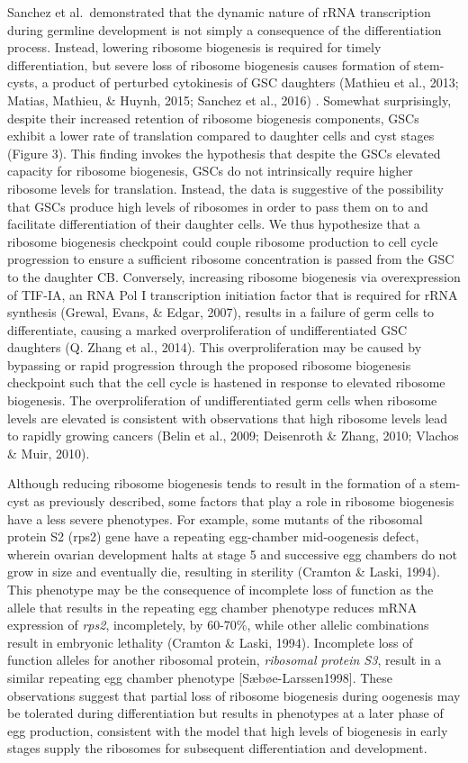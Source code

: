 \documentclass[12pt,oneside]{reedthesis}
\begin{document}
Sanchez et al.~demonstrated that the dynamic nature of rRNA
transcription during germline development is not simply a consequence of
the differentiation process. Instead, lowering ribosome biogenesis is
required for timely differentiation, but severe loss of ribosome
biogenesis causes formation of stem-cysts, a product of perturbed
cytokinesis of GSC daughters (Mathieu et al., 2013; Matias, Mathieu, \& Huynh, 2015; Sanchez et al., 2016) . Somewhat surprisingly, despite their increased
retention of ribosome biogenesis components, GSCs exhibit a lower rate
of translation compared to daughter cells and cyst stages (Figure 3).
This finding invokes the hypothesis that despite the GSCs elevated
capacity for ribosome biogenesis, GSCs do not intrinsically require
higher ribosome levels for translation. Instead, the data is suggestive
of the possibility that GSCs produce high levels of ribosomes in order
to pass them on to and facilitate differentiation of their daughter
cells. We thus hypothesize that a ribosome biogenesis checkpoint could
couple ribosome production to cell cycle progression to ensure a
sufficient ribosome concentration is passed from the GSC to the daughter
CB. Conversely, increasing ribosome biogenesis via overexpression of
TIF-IA, an RNA Pol I transcription initiation factor that is required
for rRNA synthesis (Grewal, Evans, \& Edgar, 2007), results in a failure of germ cells
to differentiate, causing a marked overproliferation of undifferentiated
GSC daughters (Q. Zhang et al., 2014). This overproliferation may be caused by
bypassing or rapid progression through the proposed ribosome biogenesis
checkpoint such that the cell cycle is hastened in response to elevated
ribosome biogenesis. The overproliferation of undifferentiated germ
cells when ribosome levels are elevated is consistent with observations
that high ribosome levels lead to rapidly growing cancers
(Belin et al., 2009; Deisenroth \& Zhang, 2010; Vlachos \& Muir, 2010).

Although reducing ribosome biogenesis tends to result in the formation
of a stem-cyst as previously described, some factors that play a role in
ribosome biogenesis have a less severe phenotypes. For example, some
mutants of the ribosomal protein S2 (rps2) gene have a repeating
egg-chamber mid-oogenesis defect, wherein ovarian development halts at
stage 5 and successive egg chambers do not grow in size and eventually
die, resulting in sterility (Cramton \& Laski, 1994). This phenotype may be
the consequence of incomplete loss of function as the allele that
results in the repeating egg chamber phenotype reduces mRNA expression
of \emph{rps2}, incompletely, by 60-70\%, while other allelic combinations
result in embryonic lethality (Cramton \& Laski, 1994). Incomplete loss of
function alleles for another ribosomal protein, \emph{ribosomal protein S3},
result in a similar repeating egg chamber phenotype
{[}Sæbøe-Larssen1998{]}. These observations suggest that partial loss of
ribosome biogenesis during oogenesis may be tolerated during
differentiation but results in phenotypes at a later phase of egg
production, consistent with the model that high levels of biogenesis in
early stages supply the ribosomes for subsequent differentiation and
development.
\end{document}
